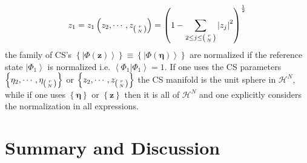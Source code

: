 \documentclass[12pt,aps,amsfonts,amssymb,tightenlines]{revtex4}%
\begin{document}
\begin{equation}
z_{1}=z_{1}\left(  z_{2},\cdots,z_{\left(
\genfrac{}{}{0pt}{}{r}{N}%
\right)  }\right)  =\left(  1-\sum_{2\leq j\leq\left(
\genfrac{}{}{0pt}{}{r}{N}%
\right)  }\left\vert z_{j}\right\vert ^{2}\right)  ^{\frac{1}{2}} \label{n2}%
\end{equation}
the family of CS's $\left\{  \left\vert \Phi\left(  \mathbf{z}\right)
\right\rangle \right\}  \equiv\left\{  \left\vert \Phi\left(  \mathbf{\eta
}\right)  \right\rangle \right\}  $ are normalized if the reference state
$\left\vert \Phi_{1}\right\rangle $ is normalized i.e. $\left\langle \left.
\Phi_{1}\right\vert \Phi_{1}\right\rangle =1.$ If one uses the CS parameters
$\left\{  \eta_{2},\cdots,\eta_{\left(
\genfrac{}{}{0pt}{}{r}{N}%
\right)  }\right\}  $ or $\left\{  z_{2},\cdots,z_{\left(
\genfrac{}{}{0pt}{}{r}{N}%
\right)  }\right\}  $ the CS manifold is the unit sphere in $\mathcal{H}^{N}$,
while if one uses $\left\{  \mathbf{\eta}\right\}  $ or $\left\{
\mathbf{z}\right\}  $ then it is all of $\mathcal{H}^{N}$ and one explicitly
considers the normalization in all expressions.

\section{Summary and Discussion\label{discussion}}
\end{document}

